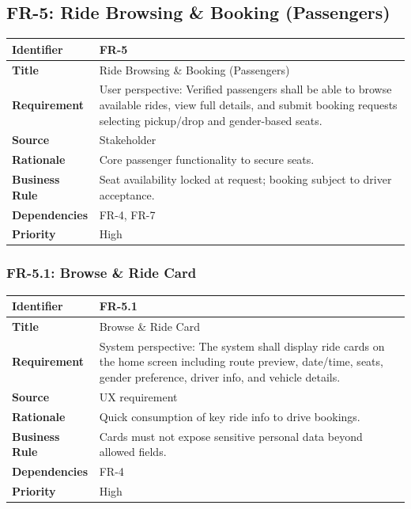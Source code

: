 \subsection{FR-5: Ride Browsing \& Booking (Passengers)}

\begin{longtable}{|p{3cm}|p{12cm}|}
\hline
\rowcolor{lightgray!30}
\textbf{Identifier} & FR-5 \\
\hline
\textbf{Title} & Ride Browsing \& Booking (Passengers) \\
\hline
\textbf{Requirement} & User perspective: Verified passengers shall be able to browse available rides, view full details, and submit booking requests selecting pickup/drop and gender-based seats. \\
\hline
\textbf{Source} & Stakeholder \\
\hline
\textbf{Rationale} & Core passenger functionality to secure seats. \\
\hline
\textbf{Business Rule} & Seat availability locked at request; booking subject to driver acceptance. \\
\hline
\textbf{Dependencies} & FR-4, FR-7 \\
\hline
\textbf{Priority} & High \\
\hline
\end{longtable}

\subsubsection{FR-5.1: Browse \& Ride Card}

\begin{longtable}{|p{3cm}|p{12cm}|}
\hline
\rowcolor{lightgray!30}
\textbf{Identifier} & FR-5.1 \\
\hline
\textbf{Title} & Browse \& Ride Card \\
\hline
\textbf{Requirement} & System perspective: The system shall display ride cards on the home screen including route preview, date/time, seats, gender preference, driver info, and vehicle details. \\
\hline
\textbf{Source} & UX requirement \\
\hline
\textbf{Rationale} & Quick consumption of key ride info to drive bookings. \\
\hline
\textbf{Business Rule} & Cards must not expose sensitive personal data beyond allowed fields. \\
\hline
\textbf{Dependencies} & FR-4 \\
\hline
\textbf{Priority} & High \\
\hline
\end{longtable}

